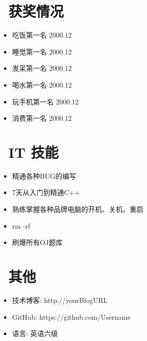 \documentclass[11pt]{article}
\begin{document}
\section{\makebox[\widthof{\faGraduationCap}][c]{\color{CVBlue}\faList}\ 获奖情况}
\begin{itemize}
	\item 吃饭第一名 \hfill 2000.12
	
	\item 睡觉第一名 \hfill 2000.12

	\item 发呆第一名 \hfill 2000.12

	\item 喝水第一名 \hfill 2000.12

	\item 玩手机第一名 \hfill 2000.12

	\item 消费第一名 \hfill 2000.12
\end{itemize}

\section{\makebox[\widthof{\faGraduationCap}][c]{\color{CVBlue}\faCogs}\ IT 技能}

\begin{itemize}
	\item 精通各种BUG的编写
	\item 7天从入门到精通C++
	\item 熟练掌握各种品牌电脑的开机、关机、重启
	\item rm -rf
	\item 刷爆所有OJ题库
\end{itemize}
	
\section{\makebox[\widthof{\faGraduationCap}][c]{\color{CVBlue}\faInfo}\ 其他}

\begin{itemize}[parsep=0.5ex]
	\item 技术博客: http://yourBlogURL
	\item GitHub: https://github.com/Username
	\item 语言: 英语六级
\end{itemize}
	
	
\end{document}
